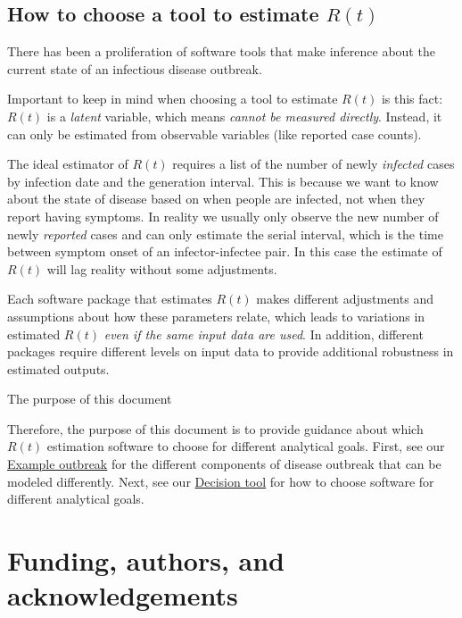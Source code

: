 \documentclass[
  letterpaper,
  DIV=11,
  numbers=noendperiod]{scrreprt}
\begin{document}
\subsection*{\texorpdfstring{How to choose a tool to estimate
\(R(t)\)}{How to choose a tool to estimate R(t)}}\label{how-to-choose-a-tool-to-estimate-rt}

There has been a proliferation of software tools that make inference
about the current state of an infectious disease outbreak.

Important to keep in mind when choosing a tool to estimate \(R(t)\) is
this fact: \(R(t)\) is a \emph{latent} variable, which means
\emph{cannot be measured directly}. Instead, it can only be estimated
from observable variables (like reported case counts).

The ideal estimator of \(R(t)\) requires a list of the number of newly
\emph{infected} cases by infection date and the generation interval.
This is because we want to know about the state of disease based on when
people are infected, not when they report having symptoms. In reality we
usually only observe the new number of newly \emph{reported} cases and
can only estimate the serial interval, which is the time between symptom
onset of an infector-infectee pair. In this case the estimate of
\(R(t)\) will lag reality without some adjustments.

Each software package that estimates \(R(t)\) makes different
adjustments and assumptions about how these parameters relate, which
leads to variations in estimated \(R(t)\) \emph{even if the same input
data are used}. In addition, different packages require different levels
on input data to provide additional robustness in estimated outputs.

The purpose of this document

Therefore, the purpose of this document is to provide guidance about
which \(R(t)\) estimation software to choose for different analytical
goals. First, see our \href{simulation_tool.qmd}{Example outbreak} for
the different components of disease outbreak that can be modeled
differently. Next, see our \href{decisiontree.qmd}{Decision tool} for
how to choose software for different analytical goals.

\section*{Funding, authors, and
acknowledgements}\label{funding-authors-and-acknowledgements}
\end{document}
